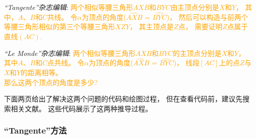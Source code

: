 \documentclass[../main.tex]{subfiles}
\begin{document}
\vspace*{2cm}

\emph{\enquote{Tangente}杂志编辑}: \textcolor{orange}{
两个相似等腰三角形$AXB$和$BYC$由主顶点分别是$X$和$Y$，
其中，$A$、$B$和$C$共线。
令$\alpha$为顶点的角度($\widehat{AXB}$ = $\widehat{BYC}$)，
然后可以构造与前两个等腰三角形相似的第三个等腰三角形$XZY$，
其主顶点是$Z$点，
需要证明$Z$点属于直线$(AC)$.}

\vspace*{2cm}

\emph{\enquote{Le Monde}杂志编辑}: \textcolor{orange}{
两个相似等腰三角形$AXB$和$BYC$的主顶点分别是$X$和$Y$，
其中$A$、$B$和$C$点共线。
令$\alpha$为顶点的角度($\widehat{AXB}$ = $\widehat{BYC}$)，
线段$[AC]$上的点$Z$与$X$和$Y$的距离相等。\\
那么这两个顶点的角度是多少?}

\vspace*{2cm}
下面两页给出了解决这两个问题的\tkznameofpack{}代码和绘图过程，
但在查看代码前，建议先搜索相关文献。
这些代码展示了这两种推导过程。

\newpage

\subsubsection{\enquote{Tangente}方法}
\end{document}
